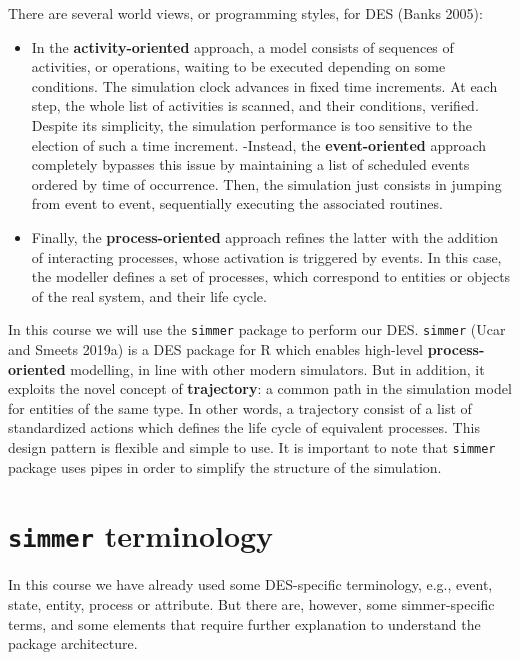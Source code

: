 \documentclass[
]{book}
\providecommand{\tightlist}{%
  \setlength{\itemsep}{0pt}\setlength{\parskip}{0pt}}
\theoremstyle{definition}
\theoremstyle{definition}
\theoremstyle{definition}
\theoremstyle{definition}
\theoremstyle{remark}
\begin{document}
There are several world views, or programming styles, for DES (Banks 2005):

\begin{itemize}
\tightlist
\item
  In the \textbf{activity-oriented} approach, a model consists of sequences of activities, or operations, waiting to be executed depending on some conditions. The simulation clock advances in fixed time increments. At each step, the whole list of activities is scanned, and their conditions, verified. Despite its simplicity, the simulation performance is too sensitive to the election of such a time increment.
  -Instead, the \textbf{event-oriented} approach completely bypasses this issue by maintaining a list of scheduled events ordered by time of occurrence. Then, the simulation just consists in jumping from event to event, sequentially executing the associated routines.
\item
  Finally, the \textbf{process-oriented} approach refines the latter with the addition of interacting processes, whose activation is triggered by events. In this case, the modeller defines a set of processes, which correspond to entities or objects of the real system, and their life cycle.
\end{itemize}

In this course we will use the \texttt{simmer} package to perform our DES. \texttt{simmer} (Ucar and Smeets 2019a) is a DES package for R which enables high-level \textbf{process-oriented} modelling, in line with other modern simulators. But in addition, it exploits the novel concept of \textbf{trajectory}: a common path in the simulation model for entities of the same type. In other words, a trajectory consist of a list of standardized actions which defines the life cycle of equivalent processes. This design pattern is flexible and simple to use. It is important to note that \texttt{simmer} package uses pipes in order to simplify the structure of the simulation.

\hypertarget{simmer-terminology}{%
\section{\texorpdfstring{\texttt{simmer} terminology}{simmer terminology}}\label{simmer-terminology}}

In this course we have already used some DES-specific terminology, e.g., event, state, entity, process or attribute. But there are, however, some simmer-specific terms, and some elements that require further explanation to understand the package architecture.
\end{document}
